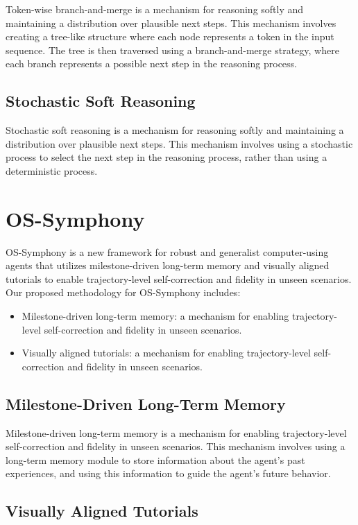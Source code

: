 \documentclass{article}
\begin{document}
Token-wise branch-and-merge is a mechanism for reasoning softly and maintaining a distribution over plausible next steps. This mechanism involves creating a tree-like structure where each node represents a token in the input sequence. The tree is then traversed using a branch-and-merge strategy, where each branch represents a possible next step in the reasoning process.

\subsection{Stochastic Soft Reasoning}

Stochastic soft reasoning is a mechanism for reasoning softly and maintaining a distribution over plausible next steps. This mechanism involves using a stochastic process to select the next step in the reasoning process, rather than using a deterministic process.

\section{OS-Symphony}

OS-Symphony is a new framework for robust and generalist computer-using agents that utilizes milestone-driven long-term memory and visually aligned tutorials to enable trajectory-level self-correction and fidelity in unseen scenarios. Our proposed methodology for OS-Symphony includes:

\begin{itemize}
\item Milestone-driven long-term memory: a mechanism for enabling trajectory-level self-correction and fidelity in unseen scenarios.
\item Visually aligned tutorials: a mechanism for enabling trajectory-level self-correction and fidelity in unseen scenarios.
\end{itemize}

\subsection{Milestone-Driven Long-Term Memory}

Milestone-driven long-term memory is a mechanism for enabling trajectory-level self-correction and fidelity in unseen scenarios. This mechanism involves using a long-term memory module to store information about the agent's past experiences, and using this information to guide the agent's future behavior.

\subsection{Visually Aligned Tutorials}
\end{document}
